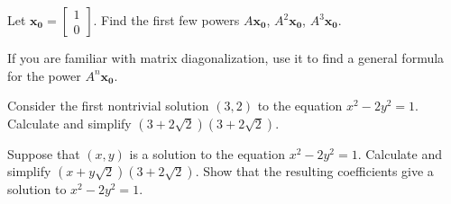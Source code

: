 \documentclass[12pt]{exam}
\begin{document}
\begin{questions}
\begin{parts}
\[    \]
    Let $\mathbf{x_0}=\begin{bmatrix}1\\0\end{bmatrix}$. Find the first few powers $A\mathbf{x_0}$, $A^2\mathbf{x_0}$, $A^3\mathbf{x_0}$.
    \item If you are familiar with matrix diagonalization, use it to find a general formula for the power $A^n\mathbf{x_0}$.
  \end{parts}
  \newpage
  \question 
  \begin{parts}
    \item Consider the first nontrivial solution $(3,2)$ to the equation $x^2-2y^2=1$. Calculate and simplify $(3+2\sqrt{2})(3+2\sqrt{2})$.
    \item Suppose that $(x,y)$ is a solution to the equation $x^2-2y^2=1$. Calculate and simplify $(x+y\sqrt{2})(3+2\sqrt{2})$. Show that the resulting coefficients give a solution to $x^2-2y^2=1$.
  \end{parts}
\end{questions}
\end{document}
